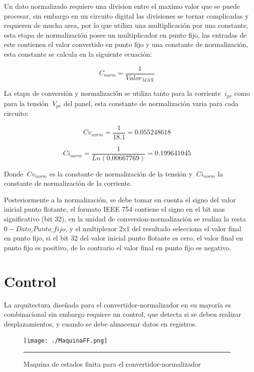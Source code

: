 Un dato normalizado requiere una division entre el maximo valor que se puede procesar, sin embargo en un circuito digital las divisiones se tornar complicadas y requieren de mucha area, por lo que utiliza una multiplicación por una constante, esta etapa de normalización  posee un multiplicador en punto fijo, las entradas de este contienen el valor convertido en punto fijo y una constante de normalización, esta constante se calcula en la siguiente ecuación: 
      

\begin{equation} \label{eq:ej1}
  C_{norm}
  = \frac{1}{Valor_{MAX}}  
\end{equation}  

La etapa de conversión y normalización se utiliza tanto para la corriente $\ i_{pv} $ como para la tensión $\ V_{pv} $ del panel, esta constante de normalización varia para cada circuito:
  
\begin{equation} \label{eq:ej2}
  Cv_{norm}
  = \frac{1}{18.1} = 0.055248618  
\end{equation}

\begin{equation} \label{eq:ej3}
  Ci_{norm}
  = \frac{1}{Ln\left(0.00667769\right)} = 0.199641045  
\end{equation}
 
 Donde $\ Cv_{norm}$ es la constante de normalización de la tensión y $\ Ci_{norm}$ la constante de normalización de la corriente. 
 
 Posteriormente a la normalización, se debe tomar en cuenta el signo del valor inicial punto flotante, el formato IEEE 754 contiene el signo en el bit mas significativo (bit 32), en la unidad de conversion-normalización se realiza la resta $0-Dato\_Punto\_fijo$, y el multiplexor 2x1 del resultado selecciona el valor final en punto fijo, si el bit 32 del valor inicial punto flotante es cero, el valor final en punto fijo es positivo, de lo contrario el valor final en punto fijo es negativo. 
  
\section{Control}

La arquitectura diseñada para el convertidor-normalizador en su mayoría es combinacional sin embargo requiere un control, que detecta si se deben realizar  desplazamientos, y cuando se debe almacenar datos en registros. 

\begin{figure}[H]
  \centering
    \texttt{[image: ./MaquinaFF.png]}
    \rule{35em}{0.5pt}
  \caption[Maquina de estados finita para el convetidor-normalizador]{Maquina de estados finita para el convertidor-normalizador}
  \label{fig:CTRLNORM}
\end{figure} 

